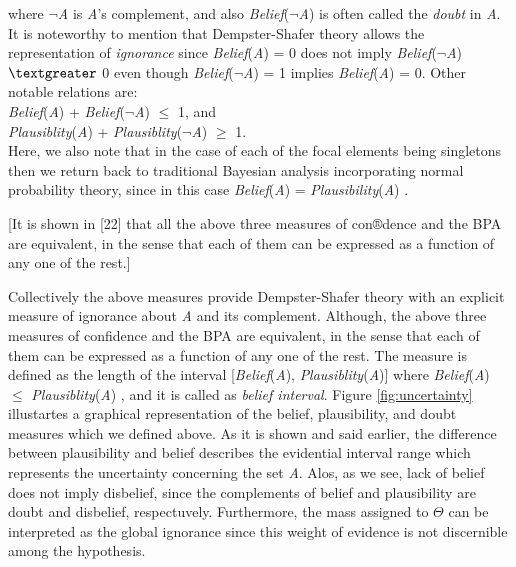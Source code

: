 \documentclass[11pt]{article}
\begin{document}
\noindent where \textit{$\neg$A} is \textit{A}'s complement, and also
\textit{Belief}(\textit{$\neg$A}) is often called the \textit{doubt} in \textit{A}.
It is noteworthy to mention that Dempster-Shafer theory allows the
representation of \textit{ignorance} since \textit{Belief}(\textit{A}) = 0 does not
imply \textit{Belief}(\textit{$\neg$A}) $\textgreater$ 0 even though
\textit{Belief}(\textit{$\neg$A}) = 1 implies \textit{Belief}(\textit{A}) = 0. Other
notable relations are:\\

\noindent\textit{Belief}(\textit{A}) + \textit{Belief}(\textit{$\neg$A}) $\leq$ 1,
and\\

\noindent\textit{Plausiblity}(\textit{A}) +
\textit{Plausiblity}(\textit{$\neg$A}) $\geq$ 1.\\

Here, we also note that in the case of each of the focal elements being
singletons then we return back to traditional Bayesian analysis incorporating
normal probability theory, since in this case \textit{Belief}(\textit{A}) =
\textit{Plausibility}(\textit{A}) \cite{beynon:dst-alternative-decision}.

[It is shown in [22] that all the above three measures of con®dence and the BPA
are equivalent, in the sense that each of them can be expressed as a function of
any one of the rest.]

Collectively the above measures provide Dempster-Shafer theory with an explicit
measure of ignorance about \textit{A} and its complement. Although, the above
three measures of confidence and the BPA are equivalent, in the sense that each
of them can be expressed as a function of any one of the rest. The measure
is defined as the length of the interval [\textit{Belief}(\textit{A}),
\textit{Plausiblity}(\textit{A})] where \textit{Belief}(\textit{A}) $\leqslant$
\textit{Plausiblity}(\textit{A}) \cite{yager:dst-combination-rules}, and it is
called as \textit{belief interval}. Figure \ref{fig:uncertainty} illustartes a
graphical representation of the belief, plausibility, and doubt measures which
we defined above. As it is shown and said earlier, the difference between
plausibility and belief describes the evidential interval range which represents
the uncertainty concerning the set \textit{A}. Alos, as we see, lack of belief
does not imply disbelief, since the complements of belief and plausibility are
doubt and disbelief, respectuvely. Furthermore, the mass assigned to $\Theta$
can be interpreted as the global ignorance since this weight of evidence is not
discernible among the hypothesis.
\end{document}
